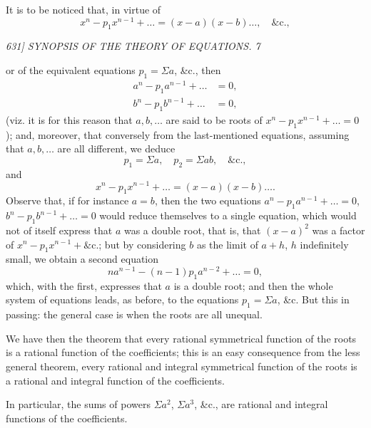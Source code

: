 \documentclass[12pt,a4paper]{article}
\begin{document}
It is to be noticed that, in virtue of
\[
x^n - p_1 x^{n-1} + \ldots = (x-a)(x-b)\ldots, \quad \&\text{c.},
\]

\clearpage
\setcounter{page}{7}

\begin{center}
\textit{631] \hfill SYNOPSIS OF THE THEORY OF EQUATIONS. \hfill 7}
\end{center}

\noindent or of the equivalent equations $p_1 = \Sigma a$, \&c., then
\begin{align*}
a^n - p_1 a^{n-1} + \ldots &= 0, \\
b^n - p_1 b^{n-1} + \ldots &= 0,
\end{align*}
(viz. it is for this reason that $a, b, \ldots$ are said to be roots of $x^n - p_1 x^{n-1} + \ldots = 0$); and, moreover, that conversely from the last-mentioned equations, assuming that $a, b, \ldots$ are all different, we deduce
\[
p_1 = \Sigma a, \quad p_2 = \Sigma a b, \quad \&\text{c.},
\]
and
\[
x^n - p_1 x^{n-1} + \ldots = (x-a)(x-b)\ldots.
\]
Observe that, if for instance $a = b$, then the two equations $a^n - p_1 a^{n-1} + \ldots = 0$, $b^n - p_1 b^{n-1} + \ldots = 0$ would reduce themselves to a single equation, which would not of itself express that $a$ was a double root, that is, that $(x-a)^2$ was a factor of $x^n - p_1 x^{n-1} + \&\text{c.}$; but by considering $b$ as the limit of $a + h$, $h$ indefinitely small, we obtain a second equation
\[
n a^{n-1} - (n-1) p_1 a^{n-2} + \ldots = 0,
\]
which, with the first, expresses that $a$ is a double root; and then the whole system of equations leads, as before, to the equations $p_1 = \Sigma a$, \&c. But this in passing: the general case is when the roots are all unequal.

We have then the theorem that every rational symmetrical function of the roots is a rational function of the coefficients; this is an easy consequence from the less general theorem, every rational and integral symmetrical function of the roots is a rational and integral function of the coefficients.

In particular, the sums of powers $\Sigma a^2$, $\Sigma a^3$, \&c., are rational and integral functions of the coefficients.
\end{document}
